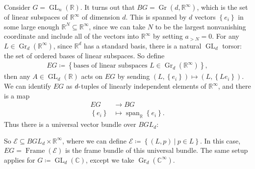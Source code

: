 \begin{example}[?]

Consider \(G = \operatorname{GL}_n({\mathbb{R}})\). It turns out that
\(BG = {\operatorname{Gr}}(d, {\mathbb{R}}^{\infty })\), which is the
set of linear subspaces of \({\mathbb{R}}^{\infty }\) of dimension
\(d\). This is spanned by \(d\) vectors \(\left\{{e_ i}\right\}\) in
some large enough \({\mathbb{R}}^N \subseteq {\mathbb{R}}^{\infty }\),
since we can take \(N\) to be the largest nonvanishing coordinate and
include all of the vectors into \({\mathbb{R}}^{\infty }\) by setting
\(a_{> N} = 0\). For any
\(L \in {\operatorname{Gr}}_d({\mathbb{R}}^{\infty })\), since
\({\mathbb{R}}^d\) has a standard basis, there is a natural
\(\operatorname{GL}_d\) torsor: the set of ordered bases of linear
subspaces. So define
\begin{align*}
EG \coloneqq\left\{{ \text{bases of linear subspaces } L \in {\operatorname{Gr}}_d({\mathbb{R}}^{\infty }) }\right\}
,\end{align*}
then any \(A\in \operatorname{GL}_d({\mathbb{R}})\) acts on \(EG\) by
sending
\((L, \left\{{e_i}\right\}) \mapsto (L, \left\{{ Le_i}\right\} )\). We
can identify \(EG\) as \(d{\hbox{-}}\)tuples of linearly independent
elements of \({\mathbb{R}}^{\infty }\), and there is a map
\begin{align*}
EG &\to BG \\
\left\{{e_i}\right\} &\mapsto {\operatorname{span}}_{\mathbb{R}}\left\{{e_i}\right\}
.\end{align*}
Thus there is a universal vector bundle over \(BGL_d\):

\begin{center}
\end{center}

So \(\mathcal{E} \subseteq BGL_d \times{\mathbb{R}}^{\infty }\), where
we can define
\(\mathcal{E} \coloneqq\left\{{(L, p) {~\mathrel{\Big|}~}p\in L}\right\}\).
In this case, \(EG = {\operatorname{Frame}}( \mathcal{E})\) is the frame
bundle of this universal bundle. The same setup applies for
\(G \coloneqq\operatorname{GL}_d({\mathbb{C}})\), except we take
\({\operatorname{Gr}}_d({\mathbb{C}}^{\infty })\).

\end{example}


